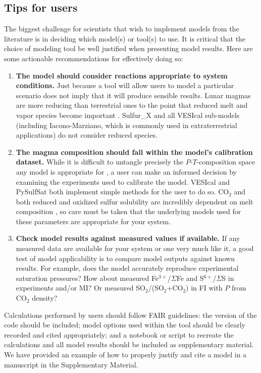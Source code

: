 \documentclass[draft, english]{volcanica-template}
\begin{document}
\subsection{Tips for users}
The biggest challenge for scientists that wish to implement models from the literature is in deciding which model(s) or tool(s) to use. It is critical that the choice of modeling tool be well justified when presenting model results. Here are some actionable recommendations for effectively doing so:
\begin{enumerate}
    \item \textbf{The model should consider reactions appropriate to system conditions.} Just because a tool will allow users to model a particular scenario does not imply that it will produce sensible results. Lunar magmas are more reducing than terrestrial ones to the point that reduced melt and vapor species become important \parencite{newcombe2017solubility,scaillet2004role}. Sulfur\_X and all VESIcal sub-models (including Iacono-Marziano, which is commonly used in extraterrestrial applications) do not consider reduced species.
    \item \textbf{The magma composition should fall within the model's calibration dataset.} While it is difficult to untangle precisely the $P$-$T$-composition space any model is appropriate for \parencite{Iacovino2021}, a user can make an informed decision by examining the experiments used to calibrate the model. VESIcal and PySulfSat both implement simple methods for the user to do so. CO$_2$ and both reduced and oxidized sulfur solubility are incredibly dependent on melt composition \parencite{o2002sulfide,GhiorsoGualda2015,Oneill2022}, so care must be taken that the underlying models used for these parameters are appropriate for your system.
    \item \textbf{Check model results against measured values if available.} If any measured data are available for your system or one very much like it, a good test of model applicability is to compare model outputs against known results. For example, does the model accurately reproduce experimental saturation pressures? How about measured Fe$^{3+}$/$\Sigma$Fe and S$^{6+}$/$\Sigma$S in experiments and/or MI? Or measured SO$_2$/(SO$_2$+CO$_2$) in FI with $P$ from CO$_2$ density?
\end{enumerate}

Calculations performed by users should follow FAIR guidelines: the version of the code should be included; model options used within the tool should be clearly recorded and cited appropriately; and a notebook or script to recreate the calculations and all model results should be included as supplementary material. We have provided an example of how to properly justify and cite a model in a manuscript in the Supplementary Material.
\end{document}
